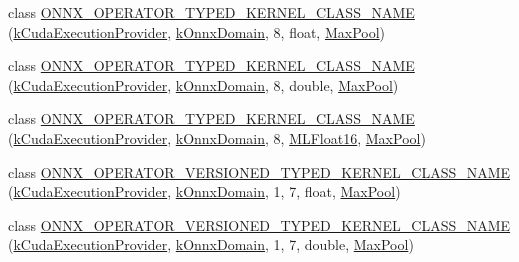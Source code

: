 \begin{DoxyCompactItemize}
\item 
class \mbox{\hyperlink{namespaceonnxruntime_1_1cuda_accdc3f5a12709b83c1f646ad41feed94}{O\+N\+N\+X\+\_\+\+O\+P\+E\+R\+A\+T\+O\+R\+\_\+\+T\+Y\+P\+E\+D\+\_\+\+K\+E\+R\+N\+E\+L\+\_\+\+C\+L\+A\+S\+S\+\_\+\+N\+A\+ME}} (\mbox{\hyperlink{namespaceonnxruntime_a73ebc64887ddd1968e3cef47ffefe35b}{k\+Cuda\+Execution\+Provider}}, \mbox{\hyperlink{namespaceonnxruntime_ac0e7c0c106a2c9e9594560a3ab289fa0}{k\+Onnx\+Domain}}, 8, float, \mbox{\hyperlink{classonnxruntime_1_1MaxPool}{Max\+Pool}})
\item 
class \mbox{\hyperlink{namespaceonnxruntime_1_1cuda_acd4ae6a15f38fb7c2667a6b0a68b633e}{O\+N\+N\+X\+\_\+\+O\+P\+E\+R\+A\+T\+O\+R\+\_\+\+T\+Y\+P\+E\+D\+\_\+\+K\+E\+R\+N\+E\+L\+\_\+\+C\+L\+A\+S\+S\+\_\+\+N\+A\+ME}} (\mbox{\hyperlink{namespaceonnxruntime_a73ebc64887ddd1968e3cef47ffefe35b}{k\+Cuda\+Execution\+Provider}}, \mbox{\hyperlink{namespaceonnxruntime_ac0e7c0c106a2c9e9594560a3ab289fa0}{k\+Onnx\+Domain}}, 8, double, \mbox{\hyperlink{classonnxruntime_1_1MaxPool}{Max\+Pool}})
\item 
class \mbox{\hyperlink{namespaceonnxruntime_1_1cuda_a580e285f85cb13189923f5d88383be00}{O\+N\+N\+X\+\_\+\+O\+P\+E\+R\+A\+T\+O\+R\+\_\+\+T\+Y\+P\+E\+D\+\_\+\+K\+E\+R\+N\+E\+L\+\_\+\+C\+L\+A\+S\+S\+\_\+\+N\+A\+ME}} (\mbox{\hyperlink{namespaceonnxruntime_a73ebc64887ddd1968e3cef47ffefe35b}{k\+Cuda\+Execution\+Provider}}, \mbox{\hyperlink{namespaceonnxruntime_ac0e7c0c106a2c9e9594560a3ab289fa0}{k\+Onnx\+Domain}}, 8, \mbox{\hyperlink{uniononnxruntime_1_1MLFloat16}{M\+L\+Float16}}, \mbox{\hyperlink{classonnxruntime_1_1MaxPool}{Max\+Pool}})
\item 
class \mbox{\hyperlink{namespaceonnxruntime_1_1cuda_ab19b836f19689c18766f038c204f8af1}{O\+N\+N\+X\+\_\+\+O\+P\+E\+R\+A\+T\+O\+R\+\_\+\+V\+E\+R\+S\+I\+O\+N\+E\+D\+\_\+\+T\+Y\+P\+E\+D\+\_\+\+K\+E\+R\+N\+E\+L\+\_\+\+C\+L\+A\+S\+S\+\_\+\+N\+A\+ME}} (\mbox{\hyperlink{namespaceonnxruntime_a73ebc64887ddd1968e3cef47ffefe35b}{k\+Cuda\+Execution\+Provider}}, \mbox{\hyperlink{namespaceonnxruntime_ac0e7c0c106a2c9e9594560a3ab289fa0}{k\+Onnx\+Domain}}, 1, 7, float, \mbox{\hyperlink{classonnxruntime_1_1MaxPool}{Max\+Pool}})
\item 
class \mbox{\hyperlink{namespaceonnxruntime_1_1cuda_a6e7fa1335cee837695d13dc95ee8544a}{O\+N\+N\+X\+\_\+\+O\+P\+E\+R\+A\+T\+O\+R\+\_\+\+V\+E\+R\+S\+I\+O\+N\+E\+D\+\_\+\+T\+Y\+P\+E\+D\+\_\+\+K\+E\+R\+N\+E\+L\+\_\+\+C\+L\+A\+S\+S\+\_\+\+N\+A\+ME}} (\mbox{\hyperlink{namespaceonnxruntime_a73ebc64887ddd1968e3cef47ffefe35b}{k\+Cuda\+Execution\+Provider}}, \mbox{\hyperlink{namespaceonnxruntime_ac0e7c0c106a2c9e9594560a3ab289fa0}{k\+Onnx\+Domain}}, 1, 7, double, \mbox{\hyperlink{classonnxruntime_1_1MaxPool}{Max\+Pool}})

\end{DoxyCompactItemize}
